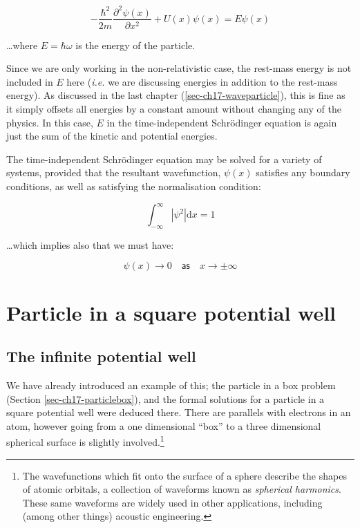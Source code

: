 \documentclass[
]{book}
\begin{document}
\begin{equation}
-\frac{\hbar^2}{2m} \frac{\partial^2 \psi(x)}{\partial x^2} + U(x) \psi(x) =  E \psi(x)
\label{eq:ch18-schrodingerti2}
\end{equation}

\ldots where \(E = \hbar \omega\) is the energy of the particle.

Since we are only working in the non-relativistic case, the rest-mass energy is not included in \(E\) here (\emph{i.e.} we are discussing energies in addition to the rest-mass energy). As discussed in the last chapter (\ref{sec-ch17-waveparticle}), this is fine as it simply offsets all energies by a constant amount without changing any of the physics. In this case, \(E\) in the time-independent Schrödinger equation is again just the sum of the kinetic and potential energies.

The time-independent Schrödinger equation may be solved for a variety of systems, provided that the resultant wavefunction, \(\psi(x)\) satisfies any boundary conditions, as well as satisfying the normalisation condition:

\begin{equation}
\int_{-\infty}^{\infty} |\psi^2| \mathrm{d}x = 1
\end{equation}

\ldots which implies also that we must have:

\begin{equation}
\psi(x) \rightarrow 0 \quad \textsf{as} \quad x \rightarrow \pm \infty
\end{equation}

\hypertarget{sec-ch18-partsquarewell1}{%
\section{Particle in a square potential well}\label{sec-ch18-partsquarewell1}}

\hypertarget{the-infinite-potential-well}{%
\subsection{The infinite potential well}\label{the-infinite-potential-well}}

We have already introduced an example of this; the particle in a box problem (Section \ref{sec-ch17-particlebox}), and the formal solutions for a particle in a square potential well were deduced there. There are parallels with electrons in an atom, however going from a one dimensional ``box'' to a three dimensional spherical surface is slightly involved.\footnote{The wavefunctions which fit onto the surface of a sphere describe the shapes of atomic orbitals, a collection of waveforms known as \emph{spherical harmonics}. These same waveforms are widely used in other applications, including (among other things) acoustic engineering.}
\end{document}
